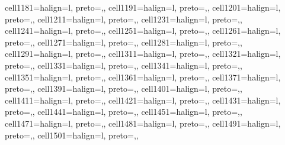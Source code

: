 \begin{table}
\begin{talltblr}[         %
caption={Technology Adoption Models:  Germany},
note{}={* p \num{< 0.1}, ** p \num{< 0.05}, *** p \num{< 0.01}},
note{ }={* p < 0.1, ** p < 0.05, *** p < 0.01},
]
{cell{118}{1}={}{halign=l, preto={\hspace{1em}},},
cell{119}{1}={}{halign=l, preto={\hspace{1em}},},
cell{120}{1}={}{halign=l, preto={\hspace{1em}},},
cell{121}{1}={}{halign=l, preto={\hspace{1em}},},
cell{123}{1}={}{halign=l, preto={\hspace{1em}},},
cell{124}{1}={}{halign=l, preto={\hspace{1em}},},
cell{125}{1}={}{halign=l, preto={\hspace{1em}},},
cell{126}{1}={}{halign=l, preto={\hspace{1em}},},
cell{127}{1}={}{halign=l, preto={\hspace{1em}},},
cell{128}{1}={}{halign=l, preto={\hspace{1em}},},
cell{129}{1}={}{halign=l, preto={\hspace{1em}},},
cell{131}{1}={}{halign=l, preto={\hspace{1em}},},
cell{132}{1}={}{halign=l, preto={\hspace{1em}},},
cell{133}{1}={}{halign=l, preto={\hspace{1em}},},
cell{134}{1}={}{halign=l, preto={\hspace{1em}},},
cell{135}{1}={}{halign=l, preto={\hspace{1em}},},
cell{136}{1}={}{halign=l, preto={\hspace{1em}},},
cell{137}{1}={}{halign=l, preto={\hspace{1em}},},
cell{139}{1}={}{halign=l, preto={\hspace{1em}},},
cell{140}{1}={}{halign=l, preto={\hspace{1em}},},
cell{141}{1}={}{halign=l, preto={\hspace{1em}},},
cell{142}{1}={}{halign=l, preto={\hspace{1em}},},
cell{143}{1}={}{halign=l, preto={\hspace{1em}},},
cell{144}{1}={}{halign=l, preto={\hspace{1em}},},
cell{145}{1}={}{halign=l, preto={\hspace{1em}},},
cell{147}{1}={}{halign=l, preto={\hspace{1em}},},
cell{148}{1}={}{halign=l, preto={\hspace{1em}},},
cell{149}{1}={}{halign=l, preto={\hspace{1em}},},
cell{150}{1}={}{halign=l, preto={\hspace{1em}},},
}
\end{talltblr}
\end{table}
